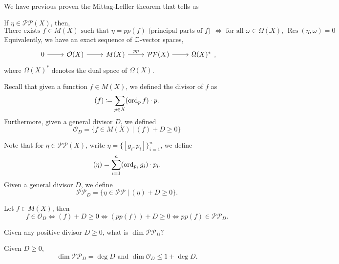 \documentclass{article}
\begin{document}
{We have previous proven the Mittag-Leffler theorem that tells us
\begin{theorem}
If $\eta \in \mathcal{P} \mathcal{P}(X)$, then,
\[\text{There exists $f \in M(X)$ such that $\eta = pp(f)$ (principal parts of $f$) $\iff$ for all $\omega \in \Omega(X)$, $\operatorname{Res}(\eta, \omega) = 0$}.\]
Equivalently, we have an exact sequence of $\mathbb{C}$-vector spaces,
\[\begin{tikzcd}
	0 & {\mathcal{O}(X)} & {M(X)} & {\mathcal{P}\mathcal{P}(X)} & {\Omega(X)^*}
	\arrow[from=1-1, to=1-2]
	\arrow[from=1-2, to=1-3]
	\arrow["pp", from=1-3, to=1-4]
	\arrow[from=1-4, to=1-5]
\end{tikzcd},\]
where $\Omega(X)^*$ denotes the dual space of $\Omega(X)$.
\end{theorem}

Recall that given a function $f \in M(X)$, we defined the divisor of $f$ as
\[(f) \coloneqq \sum_{p \in X} (\operatorname{ord}_p f) \cdot p.\]
Furthermore, given a general divisor $D$, we defined
\[\mathcal{O}_D = \{f \in M(X)\ |\ (f) + D \geq 0\}\]

\begin{definition}
    Note that for $\eta \in \mathcal{P} \mathcal{P}(X)$, write $\eta = \{[g_i, p_i]\}_{i = 1}^n$, we define
    \[(\eta) = \sum_{i = 1}^n (\operatorname{ord}_{p_i} g_i) \cdot p_i.\]
    Given a general divisor $D$, we define
    \[\mathcal{P}\mathcal{P}_D = \{\eta \in \mathcal{P} \mathcal{P}\ |\ (\eta) + D \geq 0\}. \]
\end{definition}

\begin{lemma}\label{lem::holo_pole_correspondence}
    Let $f \in M(X)$, then
    \[f \in \mathcal{O}_D \iff (f) + D \geq 0 \iff (pp(f)) + D \geq 0 \iff pp(f) \in \mathcal{P}\mathcal{P}_D.\]
\end{lemma}

\begin{question}
    Given any positive divisor $D \geq 0$, what is $\dim \mathcal{P}\mathcal{P}_D$?
\end{question}

\begin{proposition}
Given $D \geq 0$,
    $$\dim \mathcal{P}\mathcal{P}_D = \deg D \text{ and } \dim \mathcal{O}_D \leq 1 + \deg D.$$
\end{proposition}

}
\end{document}
